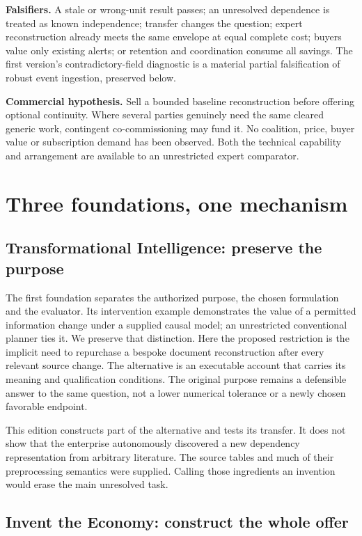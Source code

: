 \textbf{Falsifiers.} A stale or wrong-unit result passes; an unresolved dependence is treated as known independence; transfer changes the question; expert reconstruction already meets the same envelope at equal complete cost; buyers value only existing alerts; or retention and coordination consume all savings. The first version's contradictory-field diagnostic is a material partial falsification of robust event ingestion, preserved below.

\textbf{Commercial hypothesis.} Sell a bounded baseline reconstruction before offering optional continuity. Where several parties genuinely need the same cleared generic work, contingent co-commissioning may fund it. No coalition, price, buyer value or subscription demand has been observed. Both the technical capability and arrangement are available to an unrestricted expert comparator.

\section{Three foundations, one mechanism}

\subsection{Transformational Intelligence: preserve the purpose}

The first foundation separates the authorized purpose, the chosen formulation and the evaluator. Its intervention example demonstrates the value of a permitted information change under a supplied causal model; an unrestricted conventional planner ties it. We preserve that distinction.\citep{ti} Here the proposed restriction is the implicit need to repurchase a bespoke document reconstruction after every relevant source change. The alternative is an executable account that carries its meaning and qualification conditions. The original purpose remains a defensible answer to the same question, not a lower numerical tolerance or a newly chosen favorable endpoint.

This edition constructs part of the alternative and tests its transfer. It does not show that the enterprise autonomously discovered a new dependency representation from arbitrary literature. The source tables and much of their preprocessing semantics were supplied. Calling those ingredients an invention would erase the main unresolved task.

\subsection{Invent the Economy: construct the whole offer}

